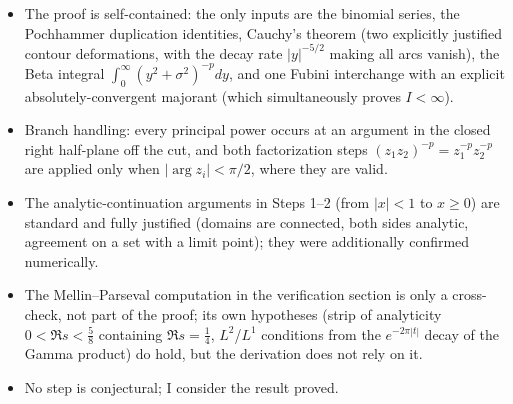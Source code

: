 \documentclass[11pt]{article}
\theoremstyle{remark}
\begin{document}
\begin{itemize}
\item The proof is self-contained: the only inputs are the binomial series, the Pochhammer duplication identities, Cauchy's theorem (two explicitly justified contour deformations, with the decay rate $|y|^{-5/2}$ making all arcs vanish), the Beta integral $\int_0^\infty(y^2+\sigma^2)^{-p}dy$, and one Fubini interchange with an explicit absolutely-convergent majorant (which simultaneously proves $I<\infty$).
\item Branch handling: every principal power occurs at an argument in the closed right half-plane off the cut, and both factorization steps $(z_1z_2)^{-p}=z_1^{-p}z_2^{-p}$ are applied only when $|\arg z_i|<\pi/2$, where they are valid.
\item The analytic-continuation arguments in Steps 1--2 (from $|x|<1$ to $x\ge0$) are standard and fully justified (domains are connected, both sides analytic, agreement on a set with a limit point); they were additionally confirmed numerically.
\item The Mellin--Parseval computation in the verification section is only a cross-check, not part of the proof; its own hypotheses (strip of analyticity $0<\Re s<\tfrac58$ containing $\Re s=\tfrac14$, $L^2$/$L^1$ conditions from the $e^{-2\pi|t|}$ decay of the Gamma product) do hold, but the derivation does not rely on it.
\item No step is conjectural; I consider the result proved.
\end{itemize}
\end{document}
